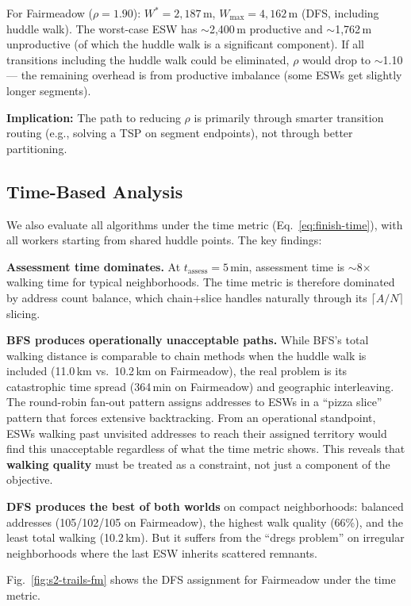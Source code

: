 \documentclass[conference]{IEEEtran}
\begin{document}
For Fairmeadow ($\rho = 1.90$): $W^* = 2{,}187$\,m, $W_{\max} = 4{,}162$\,m (DFS, including huddle walk). The worst-case ESW has $\sim$2{,}400\,m productive and $\sim$1{,}762\,m unproductive (of which the huddle walk is a significant component). If all transitions including the huddle walk could be eliminated, $\rho$ would drop to $\sim$1.10 --- the remaining overhead is from productive imbalance (some ESWs get slightly longer segments).

\textbf{Implication:} The path to reducing $\rho$ is primarily through smarter transition routing (e.g., solving a TSP on segment endpoints), not through better partitioning.

\subsection{Time-Based Analysis}
\label{sec:time-results}

We also evaluate all algorithms under the time metric (Eq.~\ref{eq:finish-time}), with all workers starting from shared huddle points. The key findings:

\textbf{Assessment time dominates.} At $t_{\text{assess}} = 5$\,min, assessment time is $\sim$8$\times$ walking time for typical neighborhoods. The time metric is therefore dominated by address count balance, which chain+slice handles naturally through its $\lceil A/N \rceil$ slicing.

\textbf{BFS produces operationally unacceptable paths.} While BFS's total walking distance is comparable to chain methods when the huddle walk is included (11.0\,km vs.\ 10.2\,km on Fairmeadow), the real problem is its catastrophic time spread (364\,min on Fairmeadow) and geographic interleaving. The round-robin fan-out pattern assigns addresses to ESWs in a ``pizza slice'' pattern that forces extensive backtracking. From an operational standpoint, ESWs walking past unvisited addresses to reach their assigned territory would find this unacceptable regardless of what the time metric shows. This reveals that \textbf{walking quality} must be treated as a constraint, not just a component of the objective.

\textbf{DFS produces the best of both worlds} on compact neighborhoods: balanced addresses (105/102/105 on Fairmeadow), the highest walk quality (66\%), and the least total walking (10.2\,km). But it suffers from the ``dregs problem'' on irregular neighborhoods where the last ESW inherits scattered remnants.

Fig.~\ref{fig:s2-trails-fm} shows the DFS assignment for Fairmeadow under the time metric.
\end{document}
